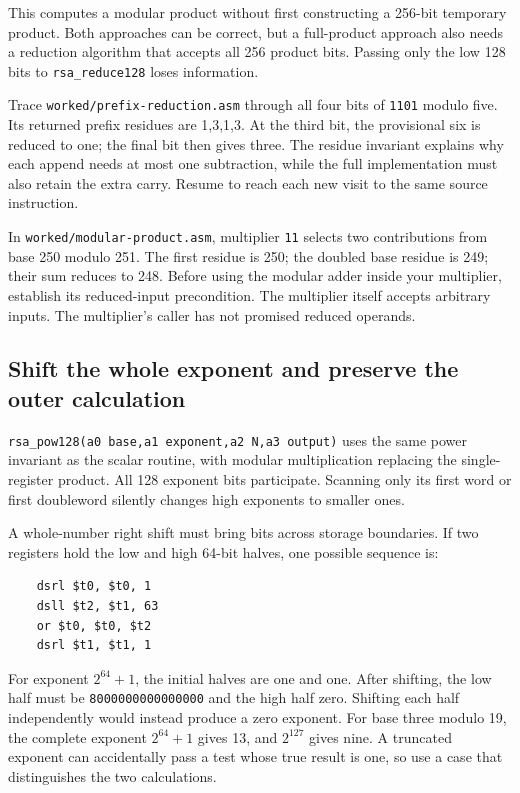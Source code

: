 

This computes a modular product without first constructing a 256-bit temporary
product. Both approaches can be correct, but a full-product approach also needs
a reduction algorithm that accepts all 256 product bits. Passing only the low
128 bits to \texttt{rsa\_reduce128} loses information.

Trace \texttt{worked/prefix-reduction.asm} through all four bits of
\texttt{1101} modulo five. Its returned prefix residues are 1,3,1,3. At the
third bit, the provisional six is reduced to one; the final bit then gives
three. The residue invariant explains why each append needs at most one
subtraction, while the full implementation must also retain the extra carry.
Resume to reach each new visit to the same source instruction.

In \texttt{worked/modular-product.asm}, multiplier \texttt{11} selects two
contributions from base 250 modulo 251. The first residue is 250; the doubled
base residue is 249; their sum reduces to 248. Before using the modular adder
inside your multiplier, establish its reduced-input precondition. The multiplier
itself accepts arbitrary inputs. The multiplier's caller has not promised reduced operands.

\subsection*{Shift the whole exponent and preserve the outer calculation}

\texttt{rsa\_pow128(a0 base,a1 exponent,a2 N,a3 output)} uses the same power
invariant as the scalar routine, with modular multiplication replacing the
single-register product. All 128 exponent bits participate. Scanning only its
first word or first doubleword silently changes high exponents to smaller ones.

A whole-number right shift must bring bits across storage boundaries. If two
registers hold the low and high 64-bit halves, one possible sequence is:

\begin{verbatim}
    dsrl $t0, $t0, 1
    dsll $t2, $t1, 63
    or $t0, $t0, $t2
    dsrl $t1, $t1, 1
\end{verbatim}

For exponent $2^{64}+1$, the initial halves are one and one. After shifting,
the low half must be \texttt{8000000000000000} and the high half zero.
Shifting each half independently would instead produce a zero exponent.
For base three modulo 19, the complete exponent $2^{64}+1$ gives 13, and
$2^{127}$ gives nine. A truncated exponent can accidentally pass a test whose
true result is one, so use a case that distinguishes the two calculations.

